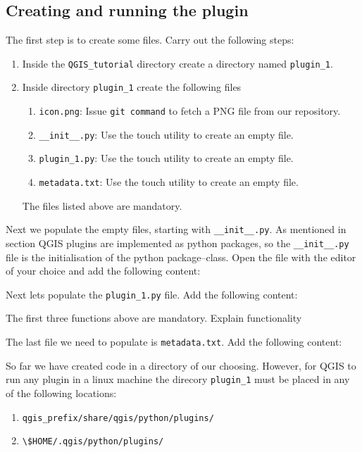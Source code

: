\subsection{Creating and running the plugin}
\label{ssect:creating_plugin_1}
\par %
The first step is to create some files. Carry out the following steps:
\begin{enumerate}
  \item Inside the \lstinline{QGIS_tutorial} directory create a directory named \lstinline{plugin_1}.
  \item Inside directory \lstinline{plugin_1} create the following files
  \begin{enumerate}
    \item \lstinline{icon.png}: Issue \lstinline{git command} to fetch a PNG file from our repository.
    \item \lstinline{__init__.py}: Use the touch utility to create an empty file.
    \item \lstinline{plugin_1.py}: Use the touch utility to create an empty file.
    \item \lstinline{metadata.txt}: Use the touch utility to create an empty file.
  \end{enumerate}
  The files listed above are mandatory.
\end{enumerate}
Next we populate the empty files, starting with \lstinline{__init__.py}. As mentioned in section \label{sect:introduction} QGIS plugins are implemented as python packages, so the \lstinline{__init__.py} file is the initialisation of the python package--class. Open the file with the editor of your choice and add the following content:

\par%
Next lets populate the \lstinline{plugin_1.py} file. Add the following content:

The first three functions above are mandatory. Explain functionality
\par%
The last file we need to populate is \lstinline{metadata.txt}. Add the following content:

\par%
So far we have created code in a directory of our choosing. However, for QGIS to run any plugin in a linux machine the direcory \lstinline{plugin_1} must be placed in any of the following locations:
\begin{enumerate}
  \item \lstinline{qgis_prefix/share/qgis/python/plugins/}
  \item \lstinline{\$HOME/.qgis/python/plugins/}
\end{enumerate}
